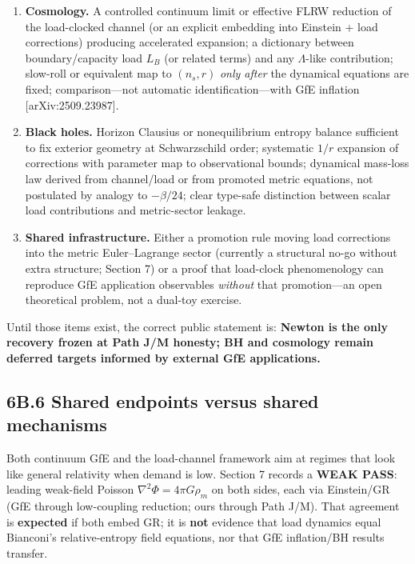 \documentclass[
  11pt,
]{article}
\newcounter{none} %
\providecommand{\tightlist}{%
  \setlength{\itemsep}{0pt}\setlength{\parskip}{0pt}}
\begin{document}
\begin{enumerate}
\def\labelenumi{\arabic{enumi}.}
\tightlist
\item
  \textbf{Cosmology.} A controlled continuum limit or effective FLRW
  reduction of the load-clocked channel (or an explicit embedding into
  Einstein + load corrections) producing accelerated expansion; a
  dictionary between boundary/capacity load \(L_B\) (or related terms)
  and any \(\Lambda\)-like contribution; slow-roll or equivalent map to
  \((n_s,r)\) \emph{only after} the dynamical equations are fixed;
  comparison---not automatic identification---with GfE inflation
  [arXiv:2509.23987].
\item
  \textbf{Black holes.} Horizon Clausius or nonequilibrium entropy
  balance sufficient to fix exterior geometry at Schwarzschild order;
  systematic \(1/r\) expansion of corrections with parameter map to
  observational bounds; dynamical mass-loss law derived from
  channel/load or from promoted metric equations, not postulated by
  analogy to \(-\beta/24\); clear type-safe distinction between scalar
  load contributions and metric-sector leakage.
\item
  \textbf{Shared infrastructure.} Either a promotion rule moving load
  corrections into the metric Euler--Lagrange sector (currently a
  structural no-go without extra structure; Section 7) or a proof that
  load-clock phenomenology can reproduce GfE application observables
  \emph{without} that promotion---an open theoretical problem, not a
  dual-toy exercise.
\end{enumerate}

Until those items exist, the correct public statement is: \textbf{Newton
is the only recovery frozen at Path J/M honesty; BH and cosmology remain
deferred targets informed by external GfE applications.}

\subsection{6B.6 Shared endpoints versus shared
mechanisms}\label{b.6-shared-endpoints-versus-shared-mechanisms}

Both continuum GfE and the load-channel framework aim at regimes that
look like general relativity when demand is low. Section 7 records a
\textbf{WEAK PASS}: leading weak-field Poisson
\(\nabla^2\Phi=4\pi G\rho_m\) on both sides, each via Einstein/GR (GfE
through low-coupling reduction; ours through Path J/M). That agreement
is \textbf{expected} if both embed GR; it is \textbf{not} evidence that
load dynamics equal Bianconi's relative-entropy field equations, nor
that GfE inflation/BH results transfer.
\end{document}
